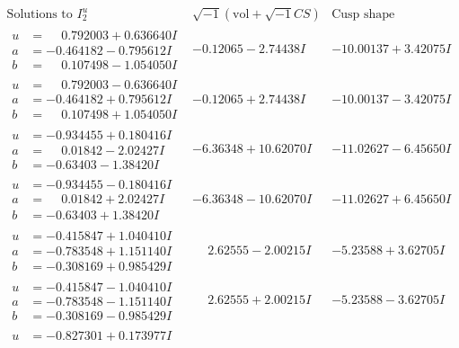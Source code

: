 \documentclass[1p]{elsarticle_modified}
\theoremstyle{definition}
\newcommand{\I}{\sqrt{-1}}
\begin{document}
$$\begin{array}{c|c|c}  
\text{Solutions to }I^u_{2}& \I (\text{vol} + \sqrt{-1}CS) & \text{Cusp shape}\\
 \hline 
\begin{aligned}
u &= \phantom{-}0.792003 + 0.636640 I \\
a &= -0.464182 - 0.795612 I \\
b &= \phantom{-}0.107498 - 1.054050 I\end{aligned}
 & -0.12065 - 2.74438 I & -10.00137 + 3.42075 I \\ \hline\begin{aligned}
u &= \phantom{-}0.792003 - 0.636640 I \\
a &= -0.464182 + 0.795612 I \\
b &= \phantom{-}0.107498 + 1.054050 I\end{aligned}
 & -0.12065 + 2.74438 I & -10.00137 - 3.42075 I \\ \hline\begin{aligned}
u &= -0.934455 + 0.180416 I \\
a &= \phantom{-}0.01842 - 2.02427 I \\
b &= -0.63403 - 1.38420 I\end{aligned}
 & -6.36348 + 10.62070 I & -11.02627 - 6.45650 I \\ \hline\begin{aligned}
u &= -0.934455 - 0.180416 I \\
a &= \phantom{-}0.01842 + 2.02427 I \\
b &= -0.63403 + 1.38420 I\end{aligned}
 & -6.36348 - 10.62070 I & -11.02627 + 6.45650 I \\ \hline\begin{aligned}
u &= -0.415847 + 1.040410 I \\
a &= -0.783548 + 1.151140 I \\
b &= -0.308169 + 0.985429 I\end{aligned}
 & \phantom{-}2.62555 - 2.00215 I & -5.23588 + 3.62705 I \\ \hline\begin{aligned}
u &= -0.415847 - 1.040410 I \\
a &= -0.783548 - 1.151140 I \\
b &= -0.308169 - 0.985429 I\end{aligned}
 & \phantom{-}2.62555 + 2.00215 I & -5.23588 - 3.62705 I \\ \hline\begin{aligned}
u &= -0.827301 + 0.173977 I \\

\end{aligned}
\end{array}$$
\end{document}
